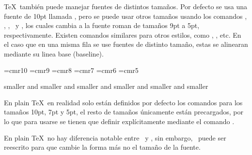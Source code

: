 \TeX\ también puede manejar fuentes de distintos tamaños. Por defecto se usa una fuente de 10pt llamada \texcs\tenrm, pero se puede usar otros tamaños usando los comandos \texcs\ninerm, \texcs\eightrm, \texcs\sevenrm, \texcs\sixrm\ y \texcs\fiverm, los cuales cambia a la fuente roman de tamaños 9pt a 5pt, respectivamente. Existen comandos similares para otros estilos, como \texcs\tensl, \texcs\ninesl, etc. En el caso que en una misma fila se use fuentes de distinto tamaño, estas se alinearan mediante su linea base (baseline).

{
\font\tenrm=cmr10  \font\ninerm=cmr9  \font\eightrm=cmr8
\font\sevenrm=cmr7  \font\sixrm=cmr6  \font\fiverm=cmr5
\begin{texexample}
  \tenrm smaller \ninerm and smaller
  \eightrm and smaller \sevenrm and smaller
  \sixrm and smaller \fiverm and smaller
\end{texexample}
}

\begin{tcolorbox}[title=Nota]
  En plain \TeX\ en realidad solo están definidos por defecto los comandos para los tamaños 10pt, 7pt y 5pt, el resto de tamaños únicamente están precargados, por lo que para usarse se tienen que definir explícitamente mediante el comando \texcs\font.
\end{tcolorbox}


En plain \TeX\ no hay diferencia notable entre \texcs\rm\ y \texcs\tenrm, sin embargo, \texcs\rm\ puede ser reescrito para que cambie la forma más no el tamaño de la fuente.


